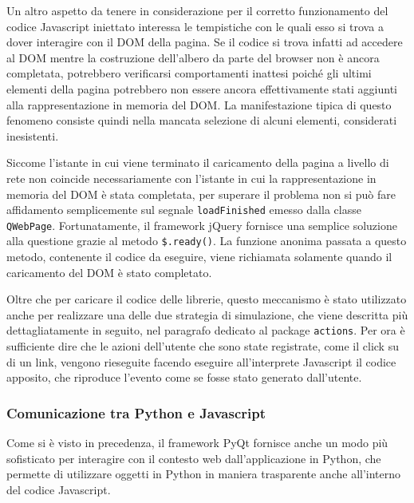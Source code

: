 

Un altro aspetto da tenere in considerazione per il corretto funzionamento del codice Javascript iniettato interessa le tempistiche con le quali esso si trova a dover interagire con il DOM della pagina. Se il codice si trova infatti ad accedere al DOM mentre la costruzione dell'albero da parte del browser non è ancora completata, potrebbero verificarsi comportamenti inattesi poiché gli ultimi elementi della pagina potrebbero non essere ancora effettivamente stati aggiunti alla rappresentazione in memoria del DOM. La manifestazione tipica di questo fenomeno consiste quindi nella mancata selezione di alcuni elementi, considerati inesistenti. 

Siccome l'istante in cui viene terminato il caricamento della pagina a livello di rete non coincide necessariamente con l'istante in cui la rappresentazione in memoria del DOM è stata completata, per superare il problema non si può fare affidamento semplicemente sul segnale \verb|loadFinished| emesso dalla classe \verb|QWebPage|. Fortunatamente, il framework jQuery fornisce una semplice soluzione alla questione grazie al metodo  \verb|$.ready()|. La funzione anonima passata a questo metodo, contenente il codice da eseguire, viene richiamata solamente quando il caricamento del DOM è stato completato.

Oltre che per caricare il codice delle librerie, questo meccanismo è stato utilizzato anche per realizzare una delle due strategia di simulazione, che viene descritta più dettagliatamente in seguito, nel paragrafo dedicato al package \verb|actions|. Per ora è sufficiente dire che le azioni dell'utente che sono state registrate, come il click su di un link, vengono rieseguite facendo eseguire all'interprete Javascript il codice apposito, che riproduce l'evento come se fosse stato generato dall'utente.

\subsubsection{Comunicazione tra Python e Javascript}

Come si è visto in precedenza, il framework PyQt fornisce anche un modo più sofisticato per interagire con il contesto web dall'applicazione in Python, che permette di utilizzare oggetti in Python in maniera trasparente anche all'interno del codice Javascript.

